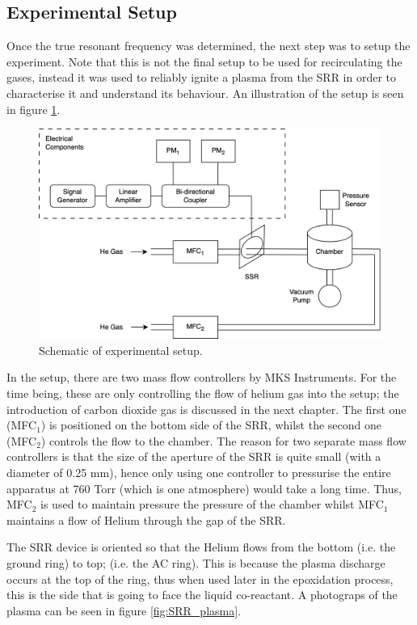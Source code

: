 \subsection{Experimental Setup}

Once the true resonant frequency was determined, the next step was to setup the experiment. Note that this is not the final setup to be used for recirculating the gases, instead it was used to reliably ignite a plasma from the SRR in order to characterise it and understand its behaviour. An illustration of the setup is seen in figure \ref{fig:SRR_setup}.

\begin{figure}[h!]
	\centering
	\includegraphics[width=\linewidth]{chapter_4/figures/SRR_setup.png}
	\caption{Schematic of experimental setup.}
	\label{fig:SRR_setup}
\end{figure}

In the setup, there are two mass flow controllers by MKS Instruments. For the time being, these are only controlling the flow of helium gas into the setup; the introduction of carbon dioxide gas is discussed in the next chapter. The first one (MFC$_1$)  is positioned on the bottom side of the SRR, whilst the second one (MFC$_2$) controls the flow to the chamber. The reason for two separate mass flow controllers is that the size of the aperture of the SRR is quite small (with a diameter of 0.25 mm), hence only using one controller to pressurise the entire apparatus at 760 Torr (which is one atmosphere) would take a long time. Thus, MFC$_2$ is used to maintain pressure the pressure of the chamber whilst MFC$_1$ maintains a flow of Helium through the gap of the SRR. 

The SRR device is oriented so that the Helium flows from the bottom (i.e. the ground ring) to top; (i.e. the AC ring). This is because the plasma discharge occurs at the top of the ring, thus when used later in the epoxidation process, this is the side that is going to face the liquid co-reactant. A photograps of the plasma can be seen in figure \ref{fig:SRR_plasma}. 

